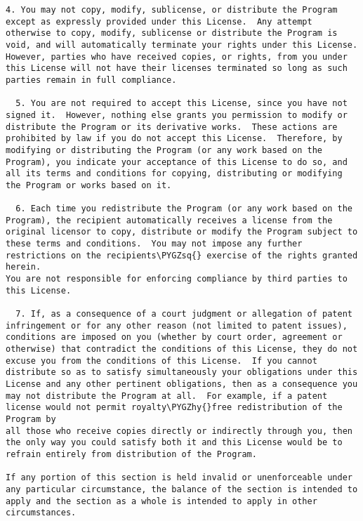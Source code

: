 \documentclass[letterpaper,10pt,english]{sphinxmanual}
\def\PYGZhy{\char`\-}
\def\PYGZsq{\char`\'}
\begin{document}
\begin{Verbatim}[commandchars=\\\{\}]
  4. You may not copy, modify, sublicense, or distribute the Program
except as expressly provided under this License.  Any attempt
otherwise to copy, modify, sublicense or distribute the Program is
void, and will automatically terminate your rights under this License.
However, parties who have received copies, or rights, from you under
this License will not have their licenses terminated so long as such
parties remain in full compliance.

  5. You are not required to accept this License, since you have not
signed it.  However, nothing else grants you permission to modify or
distribute the Program or its derivative works.  These actions are
prohibited by law if you do not accept this License.  Therefore, by
modifying or distributing the Program (or any work based on the
Program), you indicate your acceptance of this License to do so, and
all its terms and conditions for copying, distributing or modifying
the Program or works based on it.

  6. Each time you redistribute the Program (or any work based on the
Program), the recipient automatically receives a license from the
original licensor to copy, distribute or modify the Program subject to
these terms and conditions.  You may not impose any further
restrictions on the recipients\PYGZsq{} exercise of the rights granted herein.
You are not responsible for enforcing compliance by third parties to
this License.

  7. If, as a consequence of a court judgment or allegation of patent
infringement or for any other reason (not limited to patent issues),
conditions are imposed on you (whether by court order, agreement or
otherwise) that contradict the conditions of this License, they do not
excuse you from the conditions of this License.  If you cannot
distribute so as to satisfy simultaneously your obligations under this
License and any other pertinent obligations, then as a consequence you
may not distribute the Program at all.  For example, if a patent
license would not permit royalty\PYGZhy{}free redistribution of the Program by
all those who receive copies directly or indirectly through you, then
the only way you could satisfy both it and this License would be to
refrain entirely from distribution of the Program.

If any portion of this section is held invalid or unenforceable under
any particular circumstance, the balance of the section is intended to
apply and the section as a whole is intended to apply in other
circumstances.


\end{Verbatim}
\end{document}
